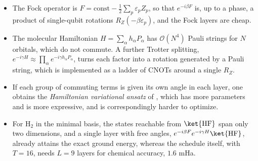 \documentclass[handoutsbeamer.tex]{subfiles}
\begin{document}
\begin{frame}\label{fr:ch05:gates}
\onp{\footnotesize}
\begin{itemize}\setlength\itemsep{0.2em}
    \item The Fock operator is $F = \mathrm{const} - \frac12\sum_p\varepsilon_pZ_p$, so that $e^{-i\beta F}$ is, up to a phase, a product of single-qubit rotations $R_Z(-\beta\varepsilon_p)$, and the Fock layers are cheap.
    \item The molecular Hamiltonian $H = \sum_\alpha h_\alpha P_\alpha$ has $\mathcal O(N^4)$ Pauli strings for $N$ orbitals, which do not commute. A further Trotter splitting, $e^{-i\gamma H}\approx\prod_\alpha e^{-i\gamma h_\alpha P_\alpha}$, turns each factor into a rotation generated by a Pauli string, which is implemented as a ladder of CNOTs around a single $R_Z$.
    \item If each group of commuting terms is given its own angle in each layer, one obtains the \emph{Hamiltonian variational ansatz} of \citet{Wecker2015}, which has more parameters and is more expressive, and is correspondingly harder to optimize.
    \item For H$_2$ in the minimal basis, the states reachable from $\ket{\rm HF}$ span only two dimensions, and a single layer with free angles, $e^{-i\beta F}e^{-i\gamma H}\ket{\rm HF}$, already attains the exact ground energy, whereas the schedule itself, with $T = 16$, needs $L = 9$ layers for chemical accuracy, $1.6$ mHa.
\end{itemize}
\end{frame}
\end{document}
